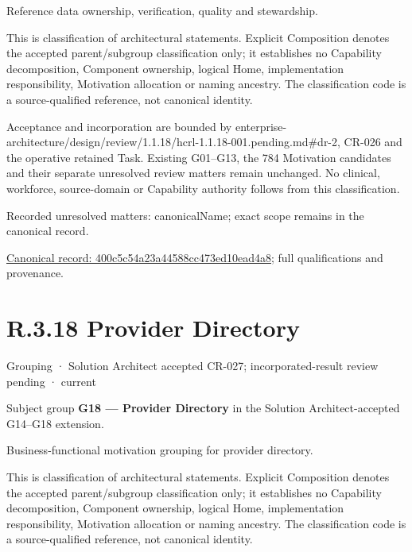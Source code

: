 Reference data ownership, verification, quality and stewardship.



This is classification of architectural statements. Explicit Composition denotes the accepted parent/subgroup classification only; it establishes no Capability decomposition, Component ownership, logical Home, implementation responsibility, Motivation allocation or naming ancestry. The classification code is a source-qualified reference, not canonical identity.



Acceptance and incorporation are bounded by enterprise-architecture/design/review/1.1.18/hcrl-1.1.18-001.pending.md\#dr-2, CR-026 and the operative retained Task. Existing G01–G13, the 784 Motivation candidates and their separate unresolved review matters remain unchanged. No clinical, workforce, source-domain or Capability authority follows from this classification.


{\small Recorded unresolved matters: canonicalName; exact scope remains in the canonical record.}\par
{\footnotesize \href{../../../../continuum/grouping/400c5c54a23a44588cc473ed10ead4a8.md}{Canonical record: 400c5c54a23a44588cc473ed10ead4a8}; full qualifications and provenance.}\par
\section*{R.3.18 Provider Directory}
\label{navigation:R.3.18}

\label{element:0233415953ed487fbbe407ebb469e7bc}
{\small Grouping · Solution Architect accepted CR-027; incorporated-result review pending · current}\par

Subject group \textbf{G18 — Provider Directory} in the Solution Architect-accepted G14–G18 extension.



Business-functional motivation grouping for provider directory.



This is classification of architectural statements. Explicit Composition denotes the accepted parent/subgroup classification only; it establishes no Capability decomposition, Component ownership, logical Home, implementation responsibility, Motivation allocation or naming ancestry. The classification code is a source-qualified reference, not canonical identity.



